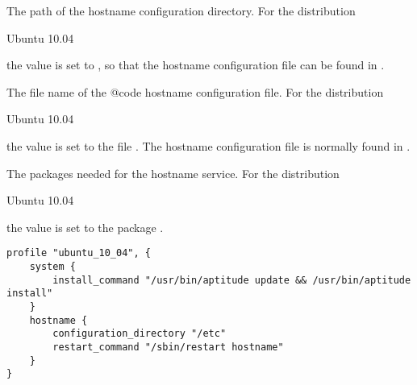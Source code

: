
The path of the hostname configuration directory.
For the distribution
\begin{inparaitem}
\item[\TheDistribution{ubuntu}] Ubuntu 10.04
\end{inparaitem}
the value is set to , so that the hostname configuration
file can be found in .


The file name of the {@code hostname} configuration file.
For the distribution
\begin{inparaitem}
\item[\TheDistribution{ubuntu}] Ubuntu 10.04
\end{inparaitem}
the value is set to the file . The hostname configuration
file is normally found in .


The packages needed for the hostname service.
For the distribution
\begin{inparaitem}
\item[\TheDistribution{ubuntu}] Ubuntu 10.04
\end{inparaitem}
the value is set to the package .

\begin{lstlisting}[style=Sscontrol,
label={lst:hostname_ubuntu_profile},
title={Ubuntu hostname profile.}]
profile "ubuntu_10_04", {
    system {
        install_command "/usr/bin/aptitude update && /usr/bin/aptitude install"
    }
    hostname {
        configuration_directory "/etc"
        restart_command "/sbin/restart hostname"
    }
}
\end{lstlisting}
